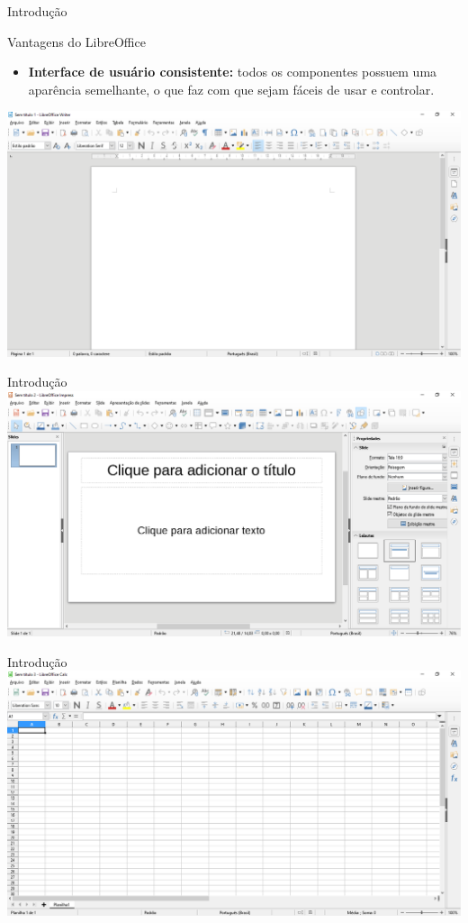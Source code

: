 \begin{frame}{Introdução}
	\begin{block}{Vantagens do LibreOffice}
		\begin{itemize}
			\item \textbf{Interface de usuário consistente:} todos os componentes possuem uma aparência semelhante, o que faz com que sejam fáceis de usar e controlar.
		\end{itemize}
	\end{block}

	\centering
	\includegraphics[width=0.8\linewidth]{Figuras/Ch04/fig2}

\end{frame}


\begin{frame}{Introdução}
	\centering
	\includegraphics[width=1\linewidth]{Figuras/Ch04/fig3}
\end{frame}


\begin{frame}{Introdução}
	\centering
	\includegraphics[width=1\linewidth]{Figuras/Ch04/fig4}
\end{frame}


